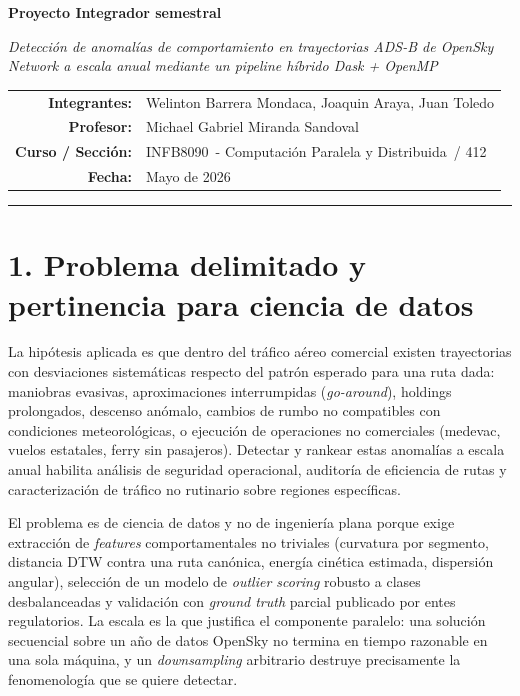 \documentclass[letterpaper,11pt]{article}
\newcommand{\codcurso}{INFB8090}
\newcommand{\nombrecurso}{Computación Paralela y Distribuida}
\newcommand{\fecha}{Mayo de 2026}
\newcommand{\profesor}{Michael Gabriel Miranda Sandoval}
\begin{document}
\pagestyle{fancy}

\begin{center}
{\Large\bfseries Proyecto Integrador semestral\par}
\vspace{0.15cm}
{\large\itshape Detección de anomalías de comportamiento en trayectorias ADS-B de OpenSky Network a escala anual mediante un pipeline híbrido Dask + OpenMP\par}
\vspace{0.25cm}
\begin{tabular}{rl}
\textbf{Integrantes:} & Welinton Barrera Mondaca, Joaquin Araya, Juan Toledo \\
\textbf{Profesor:} & \profesor \\
\textbf{Curso / Sección:} & \codcurso\ - \nombrecurso\ / 412 \\
\textbf{Fecha:} & \fecha \\
\end{tabular}
\end{center}
\vspace{0.15cm}
\hrule
\vspace{0.25cm}

\section*{1. Problema delimitado y pertinencia para ciencia de datos}

La hipótesis aplicada es que dentro del tráfico aéreo comercial existen trayectorias con desviaciones sistemáticas respecto del patrón esperado para una ruta dada: maniobras evasivas, aproximaciones interrumpidas (\textit{go-around}), holdings prolongados, descenso anómalo, cambios de rumbo no compatibles con condiciones meteorológicas, o ejecución de operaciones no comerciales (medevac, vuelos estatales, ferry sin pasajeros). Detectar y rankear estas anomalías a escala anual habilita análisis de seguridad operacional, auditoría de eficiencia de rutas y caracterización de tráfico no rutinario sobre regiones específicas.

El problema es de ciencia de datos y no de ingeniería plana porque exige extracción de \textit{features} comportamentales no triviales (curvatura por segmento, distancia DTW contra una ruta canónica, energía cinética estimada, dispersión angular), selección de un modelo de \textit{outlier scoring} robusto a clases desbalanceadas y validación con \textit{ground truth} parcial publicado por entes regulatorios. La escala es la que justifica el componente paralelo: una solución secuencial sobre un año de datos OpenSky no termina en tiempo razonable en una sola máquina, y un \textit{downsampling} arbitrario destruye precisamente la fenomenología que se quiere detectar.
\end{document}
